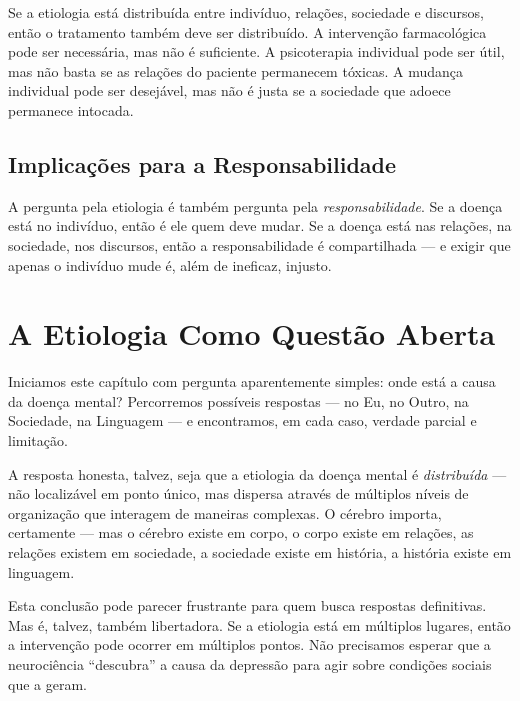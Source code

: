 Se a etiologia está distribuída entre indivíduo, relações, sociedade e discursos, então o tratamento também deve ser distribuído. A intervenção farmacológica pode ser necessária, mas não é suficiente. A psicoterapia individual pode ser útil, mas não basta se as relações do paciente permanecem tóxicas. A mudança individual pode ser desejável, mas não é justa se a sociedade que adoece permanece intocada.

\subsection{Implicações para a Responsabilidade}

A pergunta pela etiologia é também pergunta pela \textit{responsabilidade}. Se a doença está no indivíduo, então é ele quem deve mudar. Se a doença está nas relações, na sociedade, nos discursos, então a responsabilidade é compartilhada --- e exigir que apenas o indivíduo mude é, além de ineficaz, injusto.

\section{A Etiologia Como Questão Aberta}
\label{sec:etiologia-aberta}

Iniciamos este capítulo com pergunta aparentemente simples: onde está a causa da doença mental? Percorremos possíveis respostas --- no Eu, no Outro, na Sociedade, na Linguagem --- e encontramos, em cada caso, verdade parcial e limitação.

A resposta honesta, talvez, seja que a etiologia da doença mental é \textit{distribuída} --- não localizável em ponto único, mas dispersa através de múltiplos níveis de organização que interagem de maneiras complexas. O cérebro importa, certamente --- mas o cérebro existe em corpo, o corpo existe em relações, as relações existem em sociedade, a sociedade existe em história, a história existe em linguagem.

Esta conclusão pode parecer frustrante para quem busca respostas definitivas. Mas é, talvez, também libertadora. Se a etiologia está em múltiplos lugares, então a intervenção pode ocorrer em múltiplos pontos. Não precisamos esperar que a neurociência \enquote{descubra} a causa da depressão para agir sobre condições sociais que a geram.

